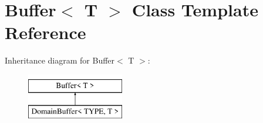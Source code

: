 \hypertarget{class_buffer}{}\section{Buffer$<$ T $>$ Class Template Reference}
\label{class_buffer}
Inheritance diagram for Buffer$<$ T $>$\+:\begin{figure}[H]
\begin{center}
\leavevmode
\includegraphics[height=2.000000cm]{class_buffer}
\end{center}
\end{figure}
